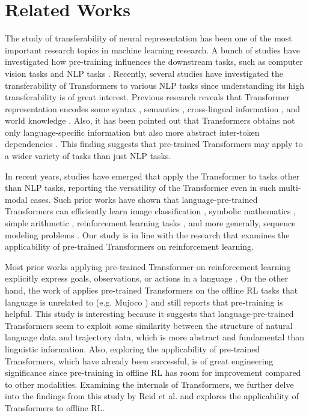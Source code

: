 \section{Related Works}
\label{section:related-works}

The study of transferability of neural representation has been one of the most important research topics in machine learning research. A bunch of studies have investigated how pre-training influences the downstream tasks, such as computer vision tasks \cite{yosinski2014transferable,djolonga2021robustness,ding2021analyzing,orhand2021quantification} and NLP tasks \cite{mou2016transferable,liu-etal-2019-linguistic,rogers2020primer}. Recently, several studies have investigated the transferability of Transformers to various NLP tasks since understanding its high transferability is of great interest. Previous research reveals that Transformer representation encodes some syntax \cite{tenney2018what}, semantics \cite{ettinger2020bert}, cross-lingual information \cite{artetxe-etal-2020-cross}, and world knowledge \cite{petroni-etal-2019-language}.
Also, it has been pointed out that Transformers obtains not only language-specific information but also more abstract inter-token dependencies \cite{ri2022pretraining,chiang2021transferability,chi-etal-2020-finding}. This finding suggests that pre-trained Transformers may apply to a wider variety of tasks than just NLP tasks.

In recent years, studies have emerged that apply the Transformer to tasks other than NLP tasks, reporting the versatility of the Transformer even in such multi-modal cases. Such prior works have shown that language-pre-trained Transformers can efficiently learn image classification \cite{lu2021pretrained}, symbolic mathematics \cite{noorbakhsh2021pretrained}, simple arithmetic \cite{brown2020language}, reinforcement learning tasks \cite{li2022pre,huang2022language,tam2022semantic,reid2022can}, and more generally, sequence modeling problems \cite{lu2021pretrained}. Our study is in line with the research that examines the applicability of pre-trained Transformers on reinforcement learning.

Most prior works applying pre-trained Transformer on reinforcement learning explicitly express goals, observations, or actions in a language \cite{yao2020keep,li2022pre,huang2022language,tam2022semantic}. On the other hand, the work of \cite{reid2022can} applies pre-trained Transformers on the offline RL tasks that language is unrelated to (e.g. Mujoco \cite{todorov2012mujoco}) and still reports that pre-training is helpful. This study is interesting because it suggests that language-pre-trained Transformers seem to exploit some similarity between the structure of natural language data and trajectory data, which is more abstract and fundamental than linguistic information. 
Also, exploring the applicability of pre-trained Transformers, which have already been successful, is of great engineering significance since pre-training in offline RL has room for improvement compared to other modalities. Examining the internals of Transformers, we further delve into the findings from this study by Reid et al. \cite{reid2022can} and explores the applicability of Transformers to offline RL.
